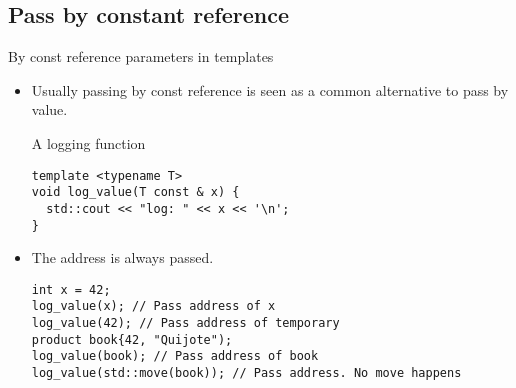 \subsection{Pass by constant reference}

\begin{frame}[t,fragile]{By const reference parameters in templates}
\begin{itemize}
  \item Usually passing by const reference is seen as a common alternative
        to pass by value.
\begin{block}{A logging function}
\begin{lstlisting}
template <typename T>
void log_value(T const & x) {
  std::cout << "log: " << x << '\n';
}
\end{lstlisting}
\end{block}

  \item The address is always passed.
\begin{lstlisting}
int x = 42;
log_value(x); // Pass address of x
log_value(42); // Pass address of temporary
product book{42, "Quijote"); 
log_value(book); // Pass address of book
log_value(std::move(book)); // Pass address. No move happens
\end{lstlisting}

\end{itemize}
\end{frame}


